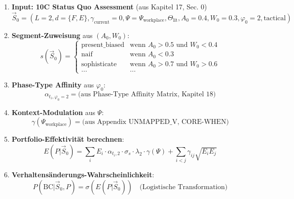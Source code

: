 \begin{enumerate}
\item \textbf{Input: 10C Status Quo Assessment} (aus Kapitel 17, Sec. 0)
\begin{equation}
\vec{S}_0 = (L=2, d=\{F,E\}, \gamma_{\text{current}}=0, \Psi=\Psi_{\text{workplace}}, \Theta_{\text{lit}}, A_0=0.4, W_0=0.3, \varphi_0=2, \text{tactical})
\end{equation}

\item \textbf{Segment-Zuweisung} aus $(A_0, W_0)$:
\begin{equation}
s(\vec{S}_0) = \begin{cases}
\text{present\_biased} & \text{wenn } A_0 > 0.5 \text{ und } W_0 < 0.4 \\
\text{naif} & \text{wenn } A_0 < 0.3 \\
\text{sophisticate} & \text{wenn } A_0 > 0.7 \text{ und } W_0 > 0.6 \\
... & ...
\end{cases}
\end{equation}

\item \textbf{Phase-Type Affinity} aus $\varphi_0$:
\begin{equation}
\alpha_{t_i, \varphi_0=2} = \text{(aus Phase-Type Affinity Matrix, Kapitel 18)}
\end{equation}

\item \textbf{Kontext-Modulation} aus $\Psi$:
\begin{equation}
\gamma(\Psi_{\text{workplace}}) = \text{(aus Appendix UNMAPPED_V, CORE-WHEN)}
\end{equation}

\item \textbf{Portfolio-Effektivität berechnen}:
\begin{equation}
E(P | \vec{S}_0) = \sum_{i} E_i \cdot \alpha_{t_i, 2} \cdot \sigma_{s} \cdot \lambda_2 \cdot \gamma(\Psi) + \sum_{i<j} \gamma_{ij} \sqrt{E_i E_j}
\end{equation}

\item \textbf{Verhaltensänderungs-Wahrscheinlichkeit}:
\begin{equation}
P(\text{BC} | \vec{S}_0, P) = \sigma(E(P | \vec{S}_0)) \quad \text{(Logistische Transformation)}
\end{equation}
\end{enumerate}

